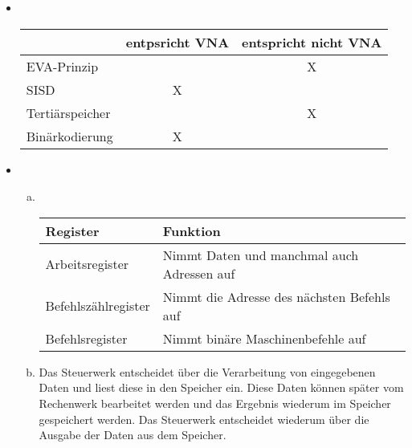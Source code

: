 \documentclass{mywork}
\begin{document}
\begin{aufgabe}
\begin{itemize}
\begin{table}[h]
\begin{tabular}{p{8cm}|p{8cm}}
				\end{tabular}
			\end{table}
		\item ~
			\begin{table}[h]
				\centering
				\begin{tabular}{l|c|c}
					 & entpsricht VNA & entspricht nicht VNA \\ \hline
					 EVA-Prinzip & & X \\
					 SISD & X &  \\
					 Tertiärspeicher &  & X \\
					 Binärkodierung & X & 
				\end{tabular}
			\end{table}
		\item ~
			\begin{enumerate}[a)]
				\item ~
					\begin{table}[h]
						\centering
						\begin{tabular}{l|l}
							Register & Funktion \\ \hline
							Arbeitsregister & Nimmt Daten und manchmal auch Adressen auf \\
							Befehlszählregister & Nimmt die Adresse des nächsten Befehls auf \\
							Befehlsregister & Nimmt binäre Maschinenbefehle auf
						\end{tabular}
					\end{table}
				\item
					Das Steuerwerk entscheidet über die Verarbeitung von eingegebenen Daten und liest diese in den Speicher ein.
					Diese Daten können später vom Rechenwerk bearbeitet werden und das Ergebnis wiederum im Speicher gespeichert werden.
					Das Steuerwerk entscheidet wiederum über die Ausgabe der Daten aus dem Speicher.
			\end{enumerate}
	\end{itemize}
\end{aufgabe}
\end{document}
